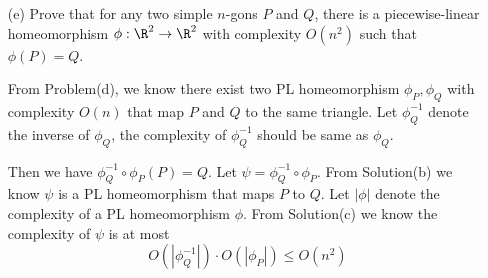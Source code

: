\documentclass[11pt]{article}
\begin{document}
\begin{enumerate}[(a)]
\begin{solution}
\end{solution}

  \item[(e)]
    Prove that for any two simple \(n\)-gons \(P\) and \(Q\), there is a piecewise-linear
    homeomorphism \(\phi : \R^2 \to \R^2\) with complexity \(O(n^2)\) such that \(\phi(P) = Q\).

\begin{solution}
  From Problem(d), we know there exist two PL homeomorphism \(\phi_P,\phi_Q\) with complexity \(O(n)\) that map \(P\) and \(Q\) to the same triangle.
  Let \(\phi^{-1}_Q\) denote the inverse of \(\phi_Q\), the complexity of \(\phi^{-1}_Q\) should be same as \(\phi_Q\).

  Then we have \(\phi^{-1}_Q\circ\phi_P(P)=Q\).
  Let \(\psi=\phi^{-1}_Q\circ \phi_P\).
  From Solution(b) we know \(\psi\) is a PL homeomorphism that maps \(P\) to \(Q\).
  Let \(|\phi|\) denote the complexity of a PL homeomorphism \(\phi\).
  From Solution(c) we know the complexity of \(\psi\) is at most
  \[O(|\phi^{-1}_Q|)\cdot O(|\phi_P|)\le O(n^2)\]


\end{solution}
\end{enumerate}
\end{document}
